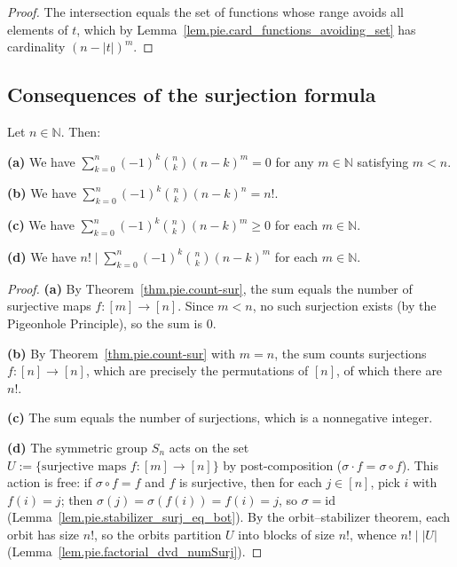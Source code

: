 \begin{proof}
The intersection equals the set of functions whose range avoids all elements of $t$,
which by Lemma~\ref{lem.pie.card_functions_avoiding_set} has cardinality $(n - |t|)^m$.
\end{proof}

\subsection{Consequences of the surjection formula}

\begin{corollary}
\label{cor.pie.count-sur.cors}
\leantarget
\leanok
Let $n \in \mathbb{N}$. Then:

\textbf{(a)} We have $\sum_{k=0}^{n} (-1)^k \binom{n}{k} (n-k)^m = 0$ for any $m \in \mathbb{N}$ satisfying $m < n$.

\textbf{(b)} We have $\sum_{k=0}^{n} (-1)^k \binom{n}{k} (n-k)^n = n!$.

\textbf{(c)} We have $\sum_{k=0}^{n} (-1)^k \binom{n}{k} (n-k)^m \geq 0$ for each $m \in \mathbb{N}$.

\textbf{(d)} We have $n! \mid \sum_{k=0}^{n} (-1)^k \binom{n}{k} (n-k)^m$ for each $m \in \mathbb{N}$.
\end{corollary}

\begin{proof}
\textbf{(a)} By Theorem~\ref{thm.pie.count-sur}, the sum equals the number of surjective
maps $f\colon [m] \to [n]$. Since $m < n$, no such surjection exists (by the
Pigeonhole Principle), so the sum is $0$.

\textbf{(b)} By Theorem~\ref{thm.pie.count-sur} with $m = n$, the sum counts surjections
$f\colon [n] \to [n]$, which are precisely the permutations of $[n]$, of which there
are $n!$.

\textbf{(c)} The sum equals the number of surjections, which is a nonnegative integer.

\textbf{(d)} The symmetric group $S_n$ acts on the set
$U := \{\text{surjective maps } f\colon [m] \to [n]\}$
by post-composition ($\sigma \cdot f = \sigma \circ f$).
This action is free: if $\sigma \circ f = f$ and $f$ is surjective, then
for each $j \in [n]$, pick $i$ with $f(i) = j$; then
$\sigma(j) = \sigma(f(i)) = f(i) = j$, so $\sigma = \mathrm{id}$
(Lemma~\ref{lem.pie.stabilizer_surj_eq_bot}).
By the orbit--stabilizer theorem, each orbit has size $n!$, so the orbits
partition $U$ into blocks of size $n!$, whence
$n! \mid |U|$ (Lemma~\ref{lem.pie.factorial_dvd_numSurj}).
\end{proof}

